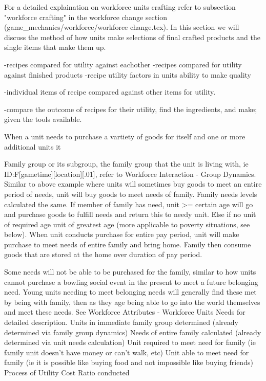 For a detailed explaination on workforce units crafting refer to subsection "workforce crafting" in the workforce change section (game_mechanics/workforce/workforce change.tex). In this section we will discuss the method of how units make selections of final crafted products and the single items that make them up. 

-recipes compared for utility against eachother
-recipes compared for utility against finished products
-recipe utility factors in units ability to make quality

-individual items of recipe compared against other items for utility.

-compare the outcome of recipes for their utility, find the ingredients, and make; given the tools available.



When a unit needs to purchase a vartiety of goods for itself and one or more additional units it

Family group or its subgroup, the family group that the unit is living with, ie ID:F[gametime][location][.01], refer to Workforce Interaction - Group Dynamics. Similar to above example where units will sometimes buy goods to meet an entire period of needs, unit will buy goods to meet needs of family.
Family needs levels calculated the same. If member of family has need, unit >= certain age will go and purchase goods to fulfill needs and return this to needy unit. Else if no unit of required age unit of greatest age (more applicable to poverty situations, see below). When unit conducts purchase for entire pay period, unit will make purchase to meet needs of entire family and bring home. Family then consume goods that are stored at the home over duration of pay period.

Some needs will not be able to be purchased for the family, similar to how units cannot purchase a bowling social event in the present to meet a future belonging need. 
Young units needing to meet belonging needs will generally find these met by being with family, then as they age being able to go into the world themselves and meet these needs. See Workforce Attributes - Workforce Units Needs for detailed description.
Units in immediate family group determined (already determined via family group dynamics)
Needs of entire family calculated (already determined via unit needs calculation)
Unit required to meet need for family (ie family unit doesn't have money or can't walk, etc)
Unit able to meet need for family (ie it is possible like buying food and not impossible like buying friends)
Process of Utility Cost Ratio conducted




